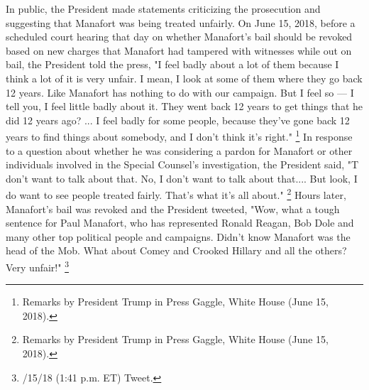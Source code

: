 In public, the President made statements criticizing the prosecution and suggesting that Manafort was being treated unfairly.
On June 15, 2018, before a scheduled court hearing that day on whether Manafort's bail should be revoked based on new charges that Manafort had tampered with witnesses while out on bail, the President told the press, "I feel badly about a lot of them because I think a lot of it is very unfair.
I mean, I look at some of them where they go back 12 years.
Like Manafort has nothing to do with our campaign.
But I feel so — I tell you, I feel little badly about it.
They went back 12 years to get things that he did 12 years ago? ...
I feel badly for some people, because they've gone back 12 years to find things about somebody, and I don't think it's right."%
\footnote{Remarks by President Trump in Press Gaggle, White House (June 15, 2018).}
In response to a question about whether he was considering a pardon for Manafort or other individuals involved in the Special Counsel's investigation, the President said, "T don't want to talk about that.
No, I don't want to talk about that....
But look, I do want to see people treated fairly.
That's what it's all about."%
\footnote{Remarks by President Trump in Press Gaggle, White House (June 15, 2018).}
Hours later, Manafort's bail was revoked and the President tweeted, "Wow, what a tough sentence for Paul Manafort, who has represented Ronald Reagan, Bob Dole and many other top political people and campaigns.
Didn't know Manafort was the head of the Mob.
What about Comey and Crooked Hillary and all the others?
Very unfair!"%
\footnote{/15/18 (1:41 p.m. ET) Tweet.}

